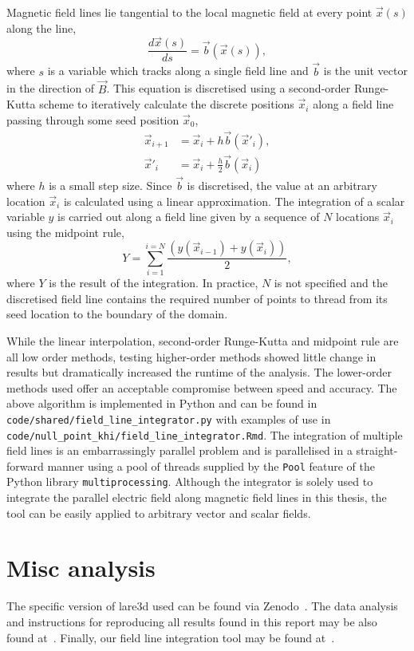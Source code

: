 Magnetic field lines lie tangential to the local magnetic field at every point $\vec{x}(s)$ along the line,
\begin{equation}
  \label{eq:field_line_equation}
  \frac{d\vec{x}(s)}{ds} = \vec{b}(\vec{x}(s)),
\end{equation}
where $s$ is a variable which tracks along a single field line and $\vec{b}$ is the unit vector in the direction of $\vec{B}$. This equation is discretised using a second-order Runge-Kutta scheme to iteratively calculate the discrete positions $\vec{x}_i$ along a field line passing through some seed position $\vec{x}_0$,
\begin{align}
  \label{eq:field_line_calculation}
  \vec{x}_{i+1} &= \vec{x}_i + h\vec{b}(\vec{x}'_i),\\
  \vec{x}'_i &= \vec{x}_i + \tfrac{h}{2}\vec{b}(\vec{x}_i)
\end{align}
where $h$ is a small step size. Since $\vec{b}$ is discretised, the value at an arbitrary location $\vec{x}_i$ is calculated using a linear approximation. The integration of a scalar variable $y$ is carried out along a field line given by a sequence of $N$ locations $\vec{x}_i$ using the midpoint rule,
\begin{equation}
  \label{eq:midpoint_rule}
  Y = \sum_{i=1}^{i=N} \frac{(y(\vec{x}_{i-1}) + y(\vec{x}_{i}))}{2},
\end{equation}
where $Y$ is the result of the integration. In practice, $N$ is not specified and the discretised field line contains the required number of points to thread from its seed location to the boundary of the domain.

While the linear interpolation, second-order Runge-Kutta and midpoint rule are all low order methods, testing higher-order methods showed little change in results but dramatically increased the runtime of the analysis. The lower-order methods used offer an acceptable compromise between speed and accuracy. The above algorithm is implemented in Python and can be found in \verb|code/shared/field_line_integrator.py| with examples of use in \verb|code/null_point_khi/field_line_integrator.Rmd|. The integration of multiple field lines is an embarrassingly parallel problem and is parallelised in a straight-forward manner using a pool of threads supplied by the \verb|Pool| feature of the Python library \verb|multiprocessing|. Although the integrator is solely used to integrate the parallel electric field along magnetic field lines in this thesis, the tool can be easily applied to arbitrary vector and scalar fields.

\section{Misc analysis}


The specific version of lare3d used can be found via Zenodo~\cite{tonyarber_2019_3560251}. The data analysis and instructions for reproducing all results found in this report may be also found at~\cite{jamie_j_quinn_2019_3560245}. Finally, our field line integration tool may be found at~\cite{jamie_j_quinn_2019_3560249}.
